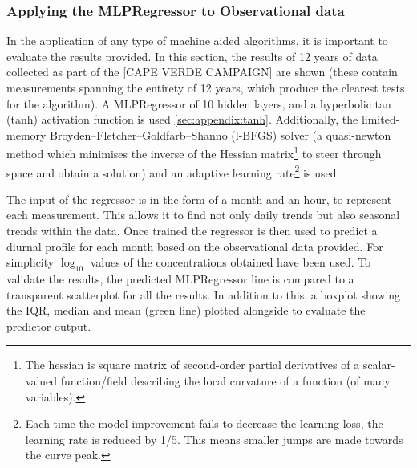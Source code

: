 \subsubsection{Applying the MLPRegressor to Observational data}
In the application of any type of machine aided algorithms, it is important to evaluate the results provided. In this section, the results of 12 years of data collected as part of the [CAPE VERDE CAMPAIGN] are shown (these contain measurements spanning the entirety of 12 years, which produce the clearest tests for the algorithm). A MLPRegressor of 10 hidden layers, and a hyperbolic tan (tanh) activation function is used \autoref{sec:appendix:tanh}. Additionally, the limited-memory Broyden–Fletcher–Goldfarb–Shanno (l-BFGS) solver (a quasi-newton method which minimises the inverse of the Hessian matrix\footnote{ The hessian is square matrix of second-order partial derivatives of a scalar-valued function/field describing the local curvature of a function (of many variables).} to steer through space and obtain a solution) and an adaptive learning rate\footnote{Each time the model improvement fails to decrease the learning loss, the learning rate is reduced by 1/5. This means smaller jumps are made towards the curve peak. } is used. 

The input of the regressor is in the form of a month and an hour, to represent each measurement. This allows it to find not only daily trends but also seasonal trends within the data. Once trained the regressor is then used to predict a diurnal profile for each month based on the observational data provided. For simplicity $\log_{10}$ values of the concentrations obtained have been used. To validate the results, the predicted MLPRegressor line is compared to a transparent scatterplot for all the results. In addition to this, a boxplot showing the IQR, median and mean (green line) plotted alongside to evaluate the predictor output. 

